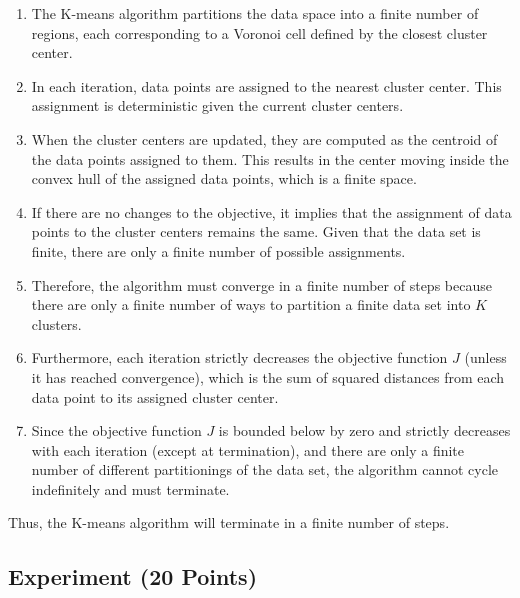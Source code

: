 \documentclass[a4paper]{article}
\newcounter{thm}
\theoremstyle{definition}
\newenvironment{soln}{
    \leavevmode\color{blue}\ignorespaces
}{}
\begin{document}
\begin{enumerate}
\begin{soln}
  \begin{enumerate}
      \item The K-means algorithm partitions the data space into a finite number of regions, each corresponding to a Voronoi cell defined by the closest cluster center.
      \item In each iteration, data points are assigned to the nearest cluster center. This assignment is deterministic given the current cluster centers.
      \item When the cluster centers are updated, they are computed as the centroid of the data points assigned to them. This results in the center moving inside the convex hull of the assigned data points, which is a finite space.
      \item If there are no changes to the objective, it implies that the assignment of data points to the cluster centers remains the same. Given that the data set is finite, there are only a finite number of possible assignments.
      \item Therefore, the algorithm must converge in a finite number of steps because there are only a finite number of ways to partition a finite data set into \( K \) clusters.
      \item Furthermore, each iteration strictly decreases the objective function \( J \) (unless it has reached convergence), which is the sum of squared distances from each data point to its assigned cluster center.
      \item Since the objective function \( J \) is bounded below by zero and strictly decreases with each iteration (except at termination), and there are only a finite number of different partitionings of the data set, the algorithm cannot cycle indefinitely and must terminate.
  \end{enumerate}

  Thus, the K-means algorithm will terminate in a finite number of steps.

\end{soln}



\end{enumerate}



\subsection{Experiment (20 Points)}
\end{document}
